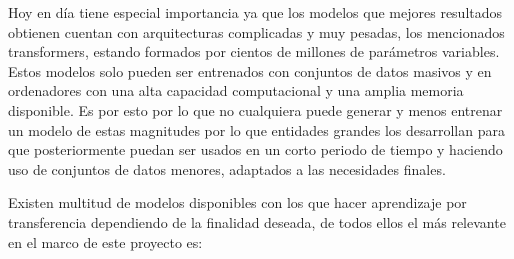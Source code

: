 Hoy en día tiene especial importancia ya que los modelos que mejores resultados
obtienen cuentan con arquitecturas complicadas y muy pesadas, los mencionados
transformers, estando formados por cientos de millones de parámetros variables.
Estos modelos solo pueden ser entrenados con conjuntos de datos masivos y en
ordenadores con una alta capacidad computacional y una amplia memoria
disponible. Es por esto por lo que no cualquiera puede generar y menos entrenar un
modelo de estas magnitudes por lo que entidades grandes los desarrollan para que
posteriormente puedan ser usados en un corto periodo de tiempo y haciendo uso de
conjuntos de datos menores, adaptados a las necesidades finales. 

Existen multitud de modelos disponibles con los que hacer aprendizaje por transferencia
dependiendo de la finalidad deseada, de todos ellos el más relevante en el marco
de este proyecto es:

